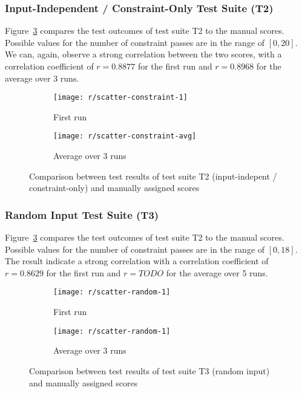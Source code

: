 \subsubsection{Input-Independent / Constraint-Only Test Suite (T2)}

Figure~\ref{fig:scatter_constraint} compares the test outcomes of test suite T2 to the manual scores.
Possible values for the number of constraint passes are in the range of $[0, 20]$.
We can, again, observe a strong correlation between the two scores,
with a correlation coefficient of $r = 0.8877$ for the first run and $r = 0.8968$ for the average over 3 runs.

\begin{figure}[htpb]
    \centering
    \begin{subfigure}{.50\textwidth}
        \texttt{[image: r/scatter-constraint-1]}
        \caption{First run}
        \label{fig:scatter_constraint_1}
    \end{subfigure}%
    \begin{subfigure}{.50\textwidth}
        \texttt{[image: r/scatter-constraint-avg]}
        \caption{Average over 3 runs}
        \label{fig:scatter_constraint_avg}
    \end{subfigure}
    \caption{Comparison between test results of test suite T2 (input-indepent / constraint-only) and manually assigned scores}
    \label{fig:scatter_constraint}
\end{figure}

\subsubsection{Random Input Test Suite (T3)}

Figure~\ref{fig:scatter_constraint} compares the test outcomes of test suite T2 to the manual scores.
Possible values for the number of constraint passes are in the range of $[0, 18]$.
The result indicate a strong correlation with a correlation coefficient of $r = 0.8629$ for the first run and $r = TODO$ for the average over 5 runs.

\begin{figure}[htpb]
    \centering
    \begin{subfigure}{.50\textwidth}
        \texttt{[image: r/scatter-random-1]}
        \caption{First run}
        \label{fig:scatter_random_1}
    \end{subfigure}%
    \begin{subfigure}{.50\textwidth}
        \texttt{[image: r/scatter-random-1]}
        \caption{Average over 3 runs}
        \label{fig:scatter_random_avg}
    \end{subfigure}
    \caption{Comparison between test results of test suite T3 (random input) and manually assigned scores}
    \label{fig:scatter_random}
\end{figure}

